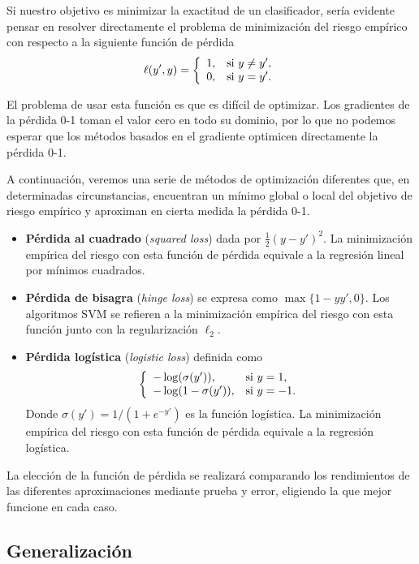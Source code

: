 \documentclass[oneside,openright,titlepage,numbers=noenddot,openany,headinclude,footinclude=true,
cleardoublepage=empty,abstractoff,BCOR=5mm,paper=a4,fontsize=12pt,main=spanish]{scrreprt}
\begin{document}
Si nuestro objetivo es minimizar la exactitud de un clasificador, sería evidente pensar en resolver directamente el problema de minimización del riesgo empírico con respecto a la siguiente función de pérdida $$\ell(y',y)=\left \{
\begin{array}{l l}
1, & \mbox{si } y\neq y', \\
0, & \mbox{si } y=y'.
\end{array}
\right.$$

El problema de usar esta función es que es difícil de optimizar. Los gradientes de la pérdida 0-1 toman el valor cero en todo su dominio, por lo que no podemos esperar que los métodos basados en el gradiente optimicen directamente la pérdida 0-1.

A continuación, veremos una serie de métodos de optimización diferentes que, en determinadas circunstancias, encuentran un mínimo global o local del objetivo de riesgo empírico y aproximan en cierta medida la pérdida 0-1.

\begin{itemize}
    \item \textbf{Pérdida al cuadrado} (\textit{squared loss}) dada por $\frac{1}{2}(y-y')^2$. La minimización empírica del riesgo con esta función de pérdida equivale a la regresión lineal por mínimos cuadrados. 
    \item \textbf{Pérdida de bisagra} (\textit{hinge loss}) se expresa como $\max\{1-yy',0\}$. Los algoritmos SVM se refieren a la minimización empírica del riesgo con esta función junto con la regularización $\ell_2$.
    \clearpage
    \item \textbf{Pérdida logística} (\textit{logistic loss}) definida como $$\left \{
    \begin{array}{l l}
    -\log(\sigma(y')), & \mbox{si } y=1, \\
    -\log(1-\sigma(y')), & \mbox{si } y=-1.
    \end{array}
    \right.$$
    Donde $\sigma(y')=1/(1+e^{-y'})$ es la función logística. La minimización empírica del riesgo con esta función de pérdida equivale a la regresión logística. 
\end{itemize}

La elección de la función de pérdida se realizará comparando los rendimientos de las diferentes aproximaciones mediante prueba y error, eligiendo la que mejor funcione en cada caso.

\subsection*{Generalización}
\end{document}
